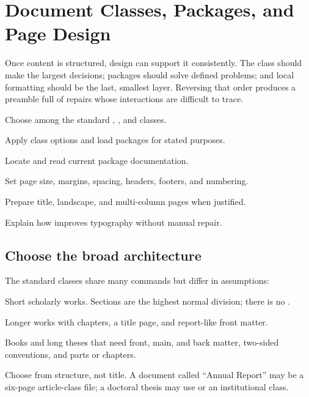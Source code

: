 \chapter{Document Classes, Packages, and Page Design}
\label{chap:design}

Once content is structured, design can support it consistently. The class
should make the largest decisions; packages should solve defined problems; and
local formatting should be the last, smallest layer. Reversing that order
produces a preamble full of repairs whose interactions are difficult to trace.

\begin{learningoutcomes}
  \item Choose among the standard , , and
         classes.
  \item Apply class options and load packages for stated purposes.
  \item Locate and read current package documentation.
  \item Set page size, margins, spacing, headers, footers, and numbering.
  \item Prepare title, landscape, and multi-column pages when justified.
  \item Explain how  improves typography without manual repair.
\end{learningoutcomes}

\section{Choose the broad architecture}

The standard classes share many commands but differ in assumptions:

\begin{description}[style=nextline,leftmargin=1.6em]
  \item[article] Short scholarly works. Sections are the highest normal
  division; there is no .
  \item[report] Longer works with chapters, a title page, and report-like
  front matter.
  \item[book] Books and long theses that need front, main, and back matter,
  two-sided conventions, and parts or chapters.
\end{description}

Choose from structure, not title. A document called ``Annual Report'' may be a
six-page article-class file; a doctoral thesis may use  or an
institutional class.

